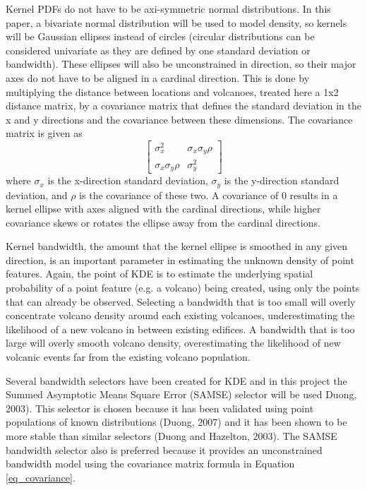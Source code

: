 \documentclass[12pt,letter]{article}
\begin{document}
Kernel PDFs do not have to be axi-symmetric normal distributions. In this paper, a bivariate normal distribution will be used to model density, so kernels will be Gaussian ellipses instead of circles (circular distributions can be considered univariate as they are defined by one standard deviation or bandwidth). These ellipses will also be unconstrained in direction, so their major axes do not have to be aligned in a cardinal direction. This is done by multiplying the distance between locations and volcanoes, treated here a 1x2 distance matrix, by a covariance matrix that defines the standard deviation in the x and y directions and the covariance between these dimensions. The covariance matrix is given as
\begin{equation}\begin{bmatrix}
\sigma_x^2 & \sigma_x\sigma_y\rho\\
\sigma_x\sigma_y\rho & \sigma_y^2
\label{eq_covariance}
\end{bmatrix}\end{equation}
where $\sigma_x$ is the x-direction standard deviation, $\sigma_y$ is the y-direction standard deviation, and $\rho$ is the covariance of these two. A covariance of 0 results in a kernel ellipse with axes aligned with the cardinal directions, while higher covariance skews or rotates the ellipse away from the cardinal directions.

Kernel bandwidth, the amount that the kernel ellipse is smoothed in any given direction, is an important parameter in estimating the unknown density of point features. Again, the point of KDE is to estimate the underlying spatial probability of a point feature (e.g. a volcano) being created, using only the points that can already be observed. Selecting a bandwidth that is too small will overly concentrate volcano density around each existing volcanoes, underestimating the likelihood of a new volcano in between existing edifices. A bandwidth that is too large will overly smooth volcano density, overestimating the likelihood of new volcanic events far from the existing volcano population.

Several bandwidth selectors have been created for KDE and in this project the Summed Asymptotic Means Square Error (SAMSE) selector will be used Duong, 2003). This selector is chosen because it has been validated using point populations of known distributions (Duong, 2007) and it has been shown to be more stable than similar selectors (Duong and Hazelton, 2003). The SAMSE bandwidth selector also is preferred because it provides an unconstrained bandwidth model using the covariance matrix formula in Equation \ref{eq_covariance}.
\end{document}
